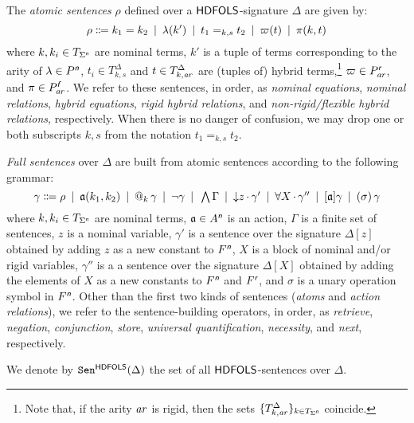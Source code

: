 \documentclass[a4paper,UKenglish,cleveref,autoref]{lipics-v2019}
\begin{document}
The \emph{atomic sentences} \(\rho\) defined over a \({\mathsf{HDFOLS}}\)-signature \(\Delta\) are given by:
\[
  \rho \Coloneqq
  k_{1} = k_{2} \enspace|\enspace
  \lambda(k') \enspace|\enspace
  t_{1} =_{k, s} t_{2} \enspace|\enspace
  \varpi(t) \enspace|\enspace
  \pi(k, t)
\]
where \(k, k_{i} \in T_{\Sigma^{\text{\normalfont\sffamily\itshape n}}}\) are nominal terms,
\(k'\) is a tuple of terms corresponding to the arity of \(\lambda \in P^{\text{\normalfont\sffamily\itshape n}}\),
\(t_{i} \in T^{\Delta}_{k, s}\) and \(t \in T^{\Delta}_{k,\mathit{a\mkern -1mu r}}\) are (tuples of) hybrid terms,\footnote{Note that, if the arity \(\mathit{a\mkern -1mu r}\) is rigid, then the sets \(\{T^{\Delta}_{k,\mathit{a\mkern -1mu r}}\}_{k \in T_{\Sigma^{\text{\normalfont\sffamily\itshape n}}}}\) coincide.}
\(\varpi \in P^{\text{\normalfont\sffamily\itshape r}}_{\mathit{a\mkern -1mu r}}\),
and \(\pi \in P^{\text{\normalfont\sffamily\itshape f}}_{\mathit{a\mkern -1mu r}}\).
We refer to these sentences, in order, as \emph{nominal equations}, \emph{nominal relations}, \emph{hybrid equations}, \emph{rigid hybrid relations}, and \emph{non-rigid/flexible hybrid relations}, respectively.
When there is no danger of confusion, we may drop one or both subscripts \(k, s\) from the notation \(t_{1} =_{k, s} t_{2}\).

\emph{Full sentences}\label{sentence-building-operators} over \(\Delta\) are built from atomic sentences according to the following grammar:
\[
  \gamma \Coloneqq
  \rho \enspace|\enspace
  \mathfrak{a}(k_{1}, k_{2}) \enspace|\enspace
  @_{k}\, \gamma \enspace|\enspace
  \lnot \gamma \enspace|\enspace
  \textstyle\bigwedge \Gamma \enspace|\enspace
  {\downarrow}z\,{\cdot}\, \gamma' \enspace|\enspace
  \forall X\,{\cdot}\, \gamma'' \enspace|\enspace
  [\mathfrak{a}] \gamma \enspace|\enspace
  (\sigma)\, \gamma
\]
where \(k, k_{i} \in T_{\Sigma^{\text{\normalfont\sffamily\itshape n}}}\) are nominal terms,
\(\mathfrak{a} \in A^{\text{\normalfont\sffamily\itshape n}}\) is an action,
\(\Gamma\) is a finite set of sentences,
\(z\) is a nominal variable,
\(\gamma'\) is a sentence over the signature \(\Delta[z]\) obtained by adding \(z\) as a new constant to \(F^{\text{\normalfont\sffamily\itshape n}}\),
\(X\) is a block of nominal and/or rigid variables,
\(\gamma''\) is a a sentence over the signature \(\Delta[X]\) obtained by adding the elements of \(X\) as a new constants to \(F^{\text{\normalfont\sffamily\itshape n}}\) and \(F^{\text{\normalfont\sffamily\itshape r}}\), and
\(\sigma\) is a unary operation symbol in \(F^{\text{\normalfont\sffamily\itshape n}}\).
Other than the first two kinds of sentences (\emph{atoms} and \emph{action relations}), we refer to the sentence-building operators, in order, as \emph{retrieve}, \emph{negation}, \emph{conjunction}, \emph{store}, \emph{universal quantification}, \emph{necessity}, and \emph{next}, respectively.

We denote by \(\mathtt{Sen}^{{\mathsf{HDFOLS}}}(\Delta)\) the set of all \({\mathsf{HDFOLS}}\)-sentences over \(\Delta\).
\end{document}
